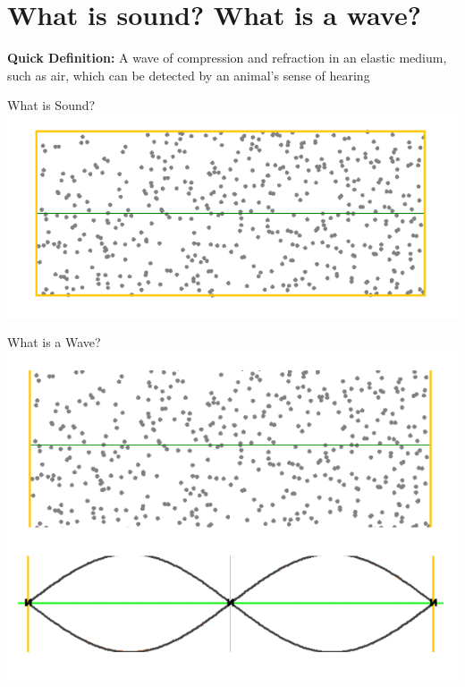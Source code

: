 \part{What is sound? What is a wave?}
\frame{\partpage}

\begin{frame}
	\begin{center}
		\textbf{Quick Definition:} A wave of compression and refraction in an elastic medium, such as air, which can be detected by an animal’s sense of hearing 
	\end{center}
\end{frame}

\begin{frame}{What is Sound?}
	\includegraphics[width=\linewidth,height=0.8\textheight,keepaspectratio]{sound_molecules}
\end{frame}

\begin{frame}{What is a Wave?}
	\includegraphics[width=\linewidth,height=0.8\textheight,keepaspectratio]{sound_wave}
\end{frame}

